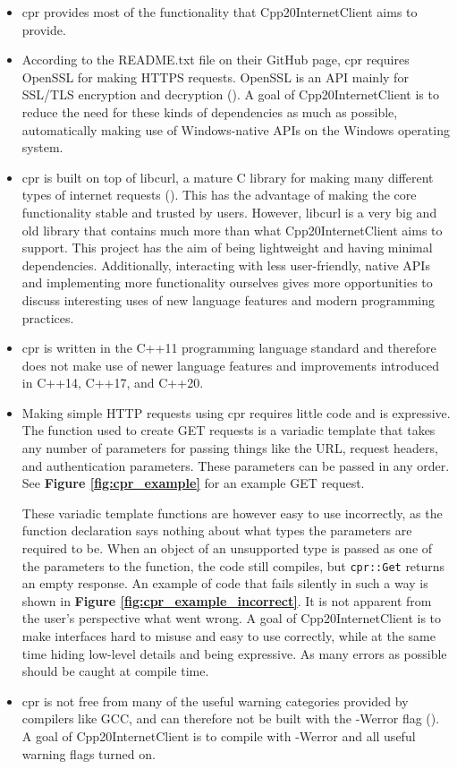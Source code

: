 \documentclass[12pt, a4paper]{article}
\begin{document}
\begin{itemize}
	\item cpr provides most of the functionality that Cpp20InternetClient aims to provide.
	\item According to the README.txt file on their GitHub page, cpr requires OpenSSL for making HTTPS requests. OpenSSL is an API mainly for SSL/TLS encryption and decryption (\cite{OpenSSL}). A goal of Cpp20InternetClient is to reduce the need for these kinds of dependencies as much as possible, automatically making use of Windows-native APIs on the Windows operating system. 
	\item cpr is built on top of libcurl, a mature C library for making many different types of internet requests (\cite{Libcurl}). This has the advantage of making the core functionality stable and trusted by users. However, libcurl is a very big and old library that contains much more than what Cpp20InternetClient aims to support. This project has the aim of being lightweight and having minimal dependencies. Additionally, interacting with less user-friendly, native APIs and implementing more functionality ourselves gives more opportunities to discuss interesting uses of new language features and modern programming practices.
	\item cpr is written in the C++11 programming language standard and therefore does not make use of newer language features and improvements introduced in C++14, C++17, and C++20.
	\item Making simple HTTP requests using cpr requires little code and is expressive. The function used to create GET requests is a variadic template that takes any number of parameters for passing things like the URL, request headers, and authentication parameters. These parameters can be passed in any order. See \textbf{Figure \ref{fig:cpr_example}} for an example GET request.

	These variadic template functions are however easy to use incorrectly, as the function declaration says nothing about what types the parameters are required to be. When an object of an unsupported type is passed as one of the parameters to the function, the code still compiles, but \texttt{cpr::Get} returns an empty response. An example of code that fails silently in such a way is shown in \textbf{Figure \ref{fig:cpr_example_incorrect}}. It is not apparent from the user’s perspective what went wrong. A goal of Cpp20InternetClient is to make interfaces hard to misuse and easy to use correctly, while at the same time hiding low-level details and being expressive. As many errors as possible should be caught at compile time.
	\item cpr is not free from many of the useful warning categories provided by compilers like GCC, and can therefore not be built with the -Werror flag (\cite{GccWarnings}). A goal of Cpp20InternetClient is to compile with -Werror and all useful warning flags turned on.
\end{itemize}
\end{document}
